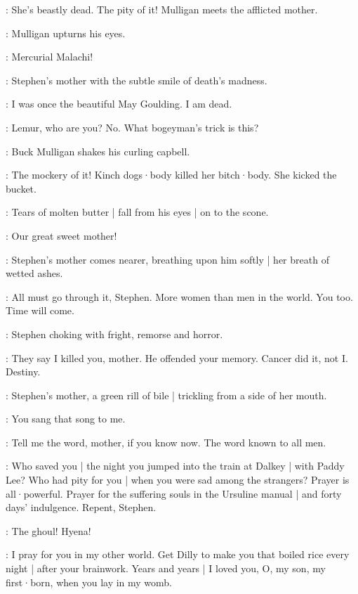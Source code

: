 \BuckMulligan:
She's beastly dead.
The pity of it!
%
Mulligan meets the afflicted mother.

:
Mulligan upturns his eyes.

\BuckMulligan:
Mercurial Malachi!

:
Stephen's mother with the subtle smile of death's madness.

\Mother:
I was once the beautiful May Goulding.
I am dead.

\Stephen:
Lemur,
who are you?
No. What bogeyman's trick is this?

:
Buck Mulligan shakes his curling capbell.

\BuckMulligan:
The mockery of it!
Kinch dogs·body killed her bitch·body.
She kicked the bucket.

:
Tears of molten butter |
fall from his eyes |
on to the scone.

\BuckMulligan:
Our great sweet mother!
%

:
Stephen's mother comes nearer,
breathing upon him softly |
her breath of wetted ashes.

\Mother:
All must go through it,
Stephen.
More women than men in the world.
You too.
Time will come.

:
Stephen choking with fright,
remorse and horror.

\Stephen:
They say I killed you,
mother.
He offended your memory.
Cancer did it,
not I.
Destiny.

:
Stephen's mother,
a green rill of bile |
trickling from a side of her mouth.

\Mother:
You sang that song to me.
%

\Stephen:
Tell me the word,
mother,
if you know now.
The word known to all men.

\Mother:
Who saved you |
the night you jumped into the train at Dalkey |
with Paddy Lee?
Who had pity for you |
when you were sad among the strangers?
Prayer is all·powerful.
Prayer for the suffering souls in the Ursuline manual |
and forty days' indulgence.
Repent,
Stephen.

\Stephen:
The ghoul!
%
Hyena!

\Mother:
I pray for you in my other world.
Get Dilly to make you that boiled rice every night |
after your brainwork.
Years and years |
I loved you,
O,
my son,
my first·born,
when you lay in my womb.

